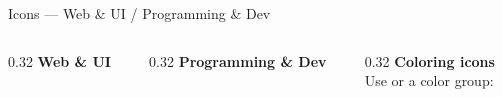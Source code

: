 \documentclass[presentation, aspectratio=169]{beamer}
\begin{document}
\begin{frame}[fragile]{Icons --- Web \& UI / Programming \& Dev}
  \begin{columns}[t, onlytextwidth]
    \begin{column}{0.32\textwidth}
      \textbf{Web \& UI}\\[0.3em]
      \\[0.15em]
      \\[0.15em]
      \\[0.15em]
      \\[0.15em]
      \\[0.15em]
      \\[0.15em]
      \\[0.15em]
    \end{column}
    \begin{column}{0.32\textwidth}
      \textbf{Programming \& Dev}\\[0.3em]
      \\[0.15em]
      \\[0.15em]
      \\[0.15em]
      \\[0.15em]
      \\[0.15em]
      \\[0.15em]
      \\[0.15em]
    \end{column}
    \begin{column}{0.32\textwidth}
      \textbf{Coloring icons}\\[0.3em]
      {\small Use \inlinecode{\\textcolor} or a color group:}\\[0.5em]
      \textcolor{orange}{}\\[0.15em]
      \textcolor{cyan}{}\\[0.15em]

\end{column}
\end{columns}
\end{frame}
\end{document}
